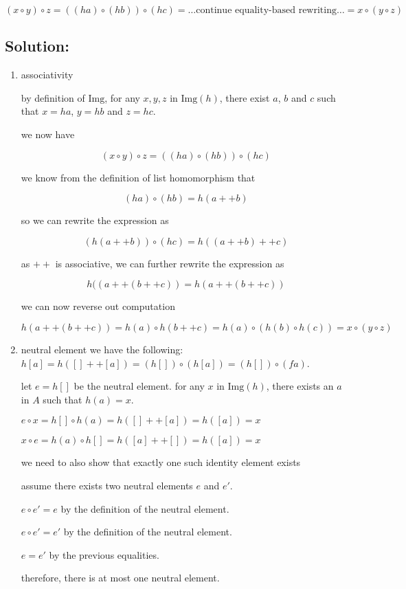 \documentclass{article}
\begin{document}
$(x \circ y) \circ z = ( (h a) \circ (h b) ) \circ (h c) = \ldots\text{continue equality-based rewriting}\ldots = x \circ (y \circ z)$

\subsection*{Solution:}

\begin{enumerate}
    \item associativity

    by definition of $\text{Img}$, for any $x, y, z$ in $\text{Img}(h)$, there exist $a$, $b$ and $c$ such that $x = h a$, $y = h b$ and $z = h c$. 

    we now have 

    \[
    (x \circ y) \circ z = ( (h a) \circ (h b) ) \circ (h c) 
    \]

    we know from the definition of list homomorphism that 

    \[
    (h a) \circ (h b) = h (a ++ b)
    \]

    so we can rewrite the expression as

    \[
    (h (a ++ b)) \circ (h c) = h ((a ++ b) ++ c)
    \]

    as $++$ is associative, we can further rewrite the expression as

    \[
    h ((a ++ (b ++ c)) = h (a ++ (b ++ c))
    \]

    we can now reverse out computation

    \[
    h(a ++ (b ++ c)) = h(a) \circ h(b ++ c) = h(a) \circ (h(b) \circ h(c)) = x \circ (y \circ z)
    \]

    \item neutral element
        we have the following:\\
        $h [a] = h ([] ++ [a]) = (h []) \circ (h [a]) = (h []) \circ (f a)$. 

        let $e = h []$ be the neutral element. 
        for any $x$ in $\text{Img}(h)$, there exists an $a$ in $A$ such that $h(a) = x$.

        $ e \circ x = h [] \circ h(a) = h( [] ++ [a]) = h([a]) = x$

        $ x \circ e = h(a) \circ h [] = h( [a] ++ []) = h([a]) = x$

        we need to also show that exactly one such identity element exists

        assume there exists two neutral elements $e$ and $e'$.

        $e \circ e' = e$ by the definition of the neutral element.

        $e \circ e' = e'$ by the definition of the neutral element.

        $e = e'$ by the previous equalities.

        therefore, there is at most one neutral element.
\end{enumerate}
\end{document}

